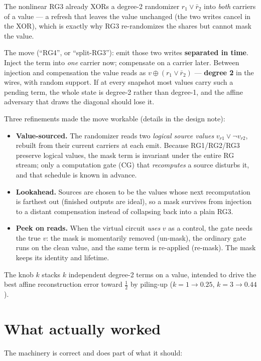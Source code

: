 \documentclass[11pt]{article}
\begin{document}
The nonlinear RG3 already XORs a degree-2 randomizer $r_1 \vee \bar r_2$ into
\emph{both} carriers of a value --- a refresh that leaves the value unchanged
(the two writes cancel in the XOR), which is exactly why RG3 re-randomizes
the shares but cannot mask the value.

The move (``RG4'', or ``split-RG3''): emit those two writes \textbf{separated
in time}. Inject the term into \emph{one} carrier now; compensate on a
carrier later. Between injection and compensation the value reads as $v
\oplus (r_1 \vee \bar r_2)$ --- \textbf{degree 2} in the wires, with random
support. If at every snapshot most values carry such a pending term, the
whole state is degree-2 rather than degree-1, and the affine adversary that
draws the diagonal should lose it.

Three refinements made the move workable (details in the design note):

\begin{itemize}
\item \textbf{Value-sourced.} The randomizer reads two \emph{logical source
values} $v_{r1} \vee \lnot v_{r2}$, rebuilt from their current carriers at
each emit. Because RG1/RG2/RG3 preserve logical values, the mask term is
invariant under the entire RG stream; only a computation gate (CG) that
\emph{recomputes} a source disturbs it, and that schedule is known in
advance.
\item \textbf{Lookahead.} Sources are chosen to be the values whose next
recomputation is farthest out (finished outputs are ideal), so a mask
survives from injection to a distant compensation instead of collapsing back
into a plain RG3.
\item \textbf{Peek on reads.} When the virtual circuit \emph{uses} $v$ as a
control, the gate needs the true $v$: the mask is momentarily removed
(un-mask), the ordinary gate runs on the clean value, and the same term is
re-applied (re-mask). The mask keeps its identity and lifetime.
\end{itemize}

The knob $k$ stacks $k$ independent degree-2 terms on a value, intended to
drive the best affine reconstruction error toward $\tfrac12$ by piling-up
($k{=}1 \to 0.25$, $k{=}3 \to 0.44$).

\section{What actually worked}

The machinery is correct and does part of what it should:
\end{document}
